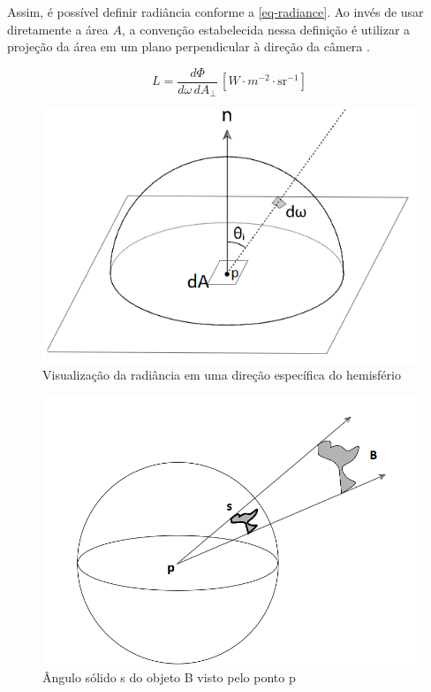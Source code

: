 \documentclass[english, 
               brazil, 
               bsc] %
               {dcomp-abntex2}
\begin{document}
Assim, é possível definir radiância conforme a \autoref{eq-radiance}. Ao invés de usar diretamente a área \( A \), a convenção estabelecida nessa definição é utilizar a projeção da área em um plano perpendicular à direção da câmera \cite{weyrich}.

\begin{equation} \label{eq-radiance}
  L = \frac{d\Phi}{d\omega \, dA_\perp} \, \left[W \cdot m^{-2} \cdot \text{sr}^{-1}\right]
\end{equation}


\begin{figure}[h]
	\caption{\label{radiance-img} \small Visualização da radiância em uma direção específica do hemisfério}
	\begin{center}
	    \includegraphics[scale=0.5]{./Imagens/irradiance_hemisphere.png}
	\end{center}
\end{figure}


\begin{figure}[htb]
  \caption{\label{solid-angle} \small   Ângulo sólido s do objeto B visto pelo ponto p}
	\begin{center}
	    \includegraphics[scale=0.5]{./Imagens/solid_angle.png}
	\end{center}
\end{figure}
\end{document}
